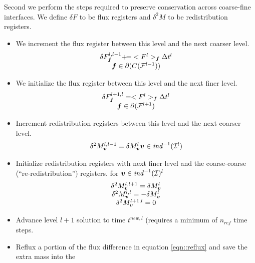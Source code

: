 Second we perform the steps required to preserve 
conservation across coarse-fine interfaces.  We define $\delta F$
to be flux registers and $\delta^2 M$ to be redistribution registers.
\begin{itemize}
\item We increment the flux register between this level and the next
      coarser level.
\begin{equation}
\begin{array}{c}
\delta F^{l,l-1}_{\boldsymbol{f}} \mathbin{+\mkern-7mu=} <F^l>_{\boldsymbol{f}} \Delta t^l \\
{\boldsymbol{f}} \in \partial(C({\cal F}^{l-1}))
\end{array}
\end{equation}
\item We initialize the flux register between this level and the next
finer level.
\begin{equation}
\begin{array}{c}
\delta F^{l+1,l}_{\boldsymbol{f}} = <F^l>_{\boldsymbol{f}} \Delta t^l \\
{\boldsymbol{f}} \in \partial({\cal F}^{l+1})
\end{array}
\label{eqn::reflux}
\end{equation}
\item Increment redistribution registers between this level
      and the next coarser level.
\begin{equation}
\begin{array}{c}
\delta^2 M^{l, l-1}_{\boldsymbol{v}} = \delta M^l_{\boldsymbol{v}}
{\boldsymbol{v}} \in {\it ind}^{-1}({\cal I}^l) 
\end{array}
\end{equation}
\item Initialize redistribution registers with next finer level
      and the coarse-coarse (``re-redistribution'') registers.
      for ${\boldsymbol{v}} \in {\it ind}^{-1}({\cal I})^l$
\begin{equation}
\begin{array}{c}
\delta^2 M^{l, l+1}_{\boldsymbol{v}} = \delta M^l_{\boldsymbol{v}} \\
\delta^2 M^{l, l}_{\boldsymbol{v}} =-\delta M^l_{\boldsymbol{v}} \\
\delta^2 M^{l+1, l}_{\boldsymbol{v}} = 0 
\end{array}
\label{eqn::mlredist1}
\end{equation}
\item Advance level $l+1$ solution to time $t^{new,l}$ (requires
a minimum of $n_{ref}$ time steps.
\item Reflux a portion of the flux difference
in equation \ref{eqn::reflux} and save the extra mass into the

\end{itemize}
